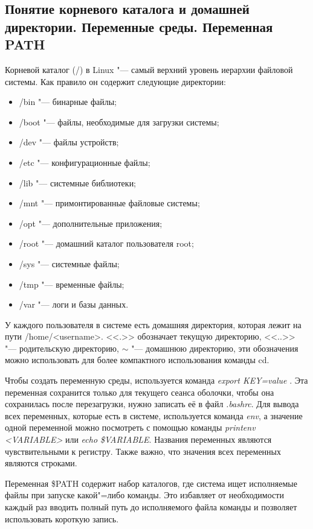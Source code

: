 \documentclass[12pt]{article}
\begin{document}
\subsection{Понятие корневого каталога и домашней директории. Переменные среды. Переменная PATH}
Корневой каталог (/) в Linux "--- самый верхний уровень иерархии файловой системы. Как правило он содержит следующие директории:
\begin{itemize}
\item /bin "--- бинарные файлы;
\item /boot "--- файлы, необходимые для загрузки системы;
\item /dev "--- файлы устройств;
\item /etc "--- конфигурационные файлы;
\item /lib "--- системные библиотеки;
\item /mnt "--- примонтированные файловые системы;
\item /opt "--- дополнительные приложения;
\item /root "--- домашний каталог пользователя root;
\item /sys "--- системные файлы;
\item /tmp "--- временные файлы;
\item /var "--- логи и базы данных.
\end{itemize}

У каждого пользователя в системе есть домашняя директория, которая лежит на пути /home/<username>. <<.>> обозначает текущую директорию, <<..>> "--- родительскую директорию, $\sim$ "--- домашнюю директорию, эти обозначения можно использовать для более компактного использования команды cd.

Чтобы создать переменную среды, используется команда \textit{export KEY=\glqq value \grqq}. Эта переменная сохранится только для текущего сеанса оболочки, чтобы она сохранилась после перезагрузки, нужно записать её в файл \textit{.bashrc}. Для вывода всех переменных, которые есть в системе, используется команда \textit{env}, а значение одной переменной можно посмотреть с помощью команды \textit{printenv <VARIABLE>} или \textit{echo \$VARIABLE}. Названия переменных являются чувствительными к регистру. Также важно, что значения всех переменных являются строками.

Переменная \$PATH содержит набор каталогов, где система ищет исполняемые файлы при запуске какой"=либо команды. Это избавляет от необходимости каждый раз вводить полный путь до исполняемого файла команды и позволяет использовать короткую запись.
\end{document}
